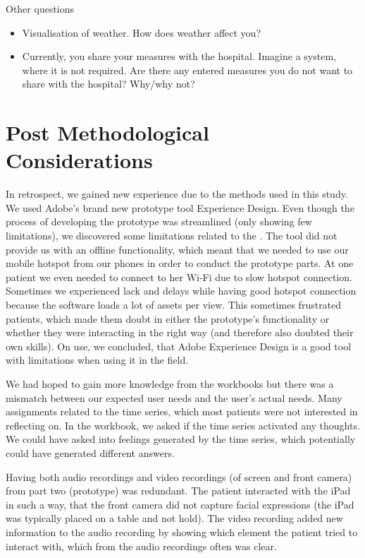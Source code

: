 Other questions
\begin{itemize}
\item Visualisation of weather. How does weather affect you?
\item Currently, you share your measures with the hospital. Imagine a system, where it is not required. Are there any entered measures you do not want to share with the hospital? Why/why not?
\end{itemize}



\section{Post Methodological Considerations}
In retrospect, we gained new experience due to the methods used in this study. We used Adobe's brand new prototype tool Experience Design. Even though the process of developing the prototype was streamlined (only showing few limitations), we discovered some limitations related to the . The tool did not provide us with an offline functionality, which meant that we needed to use our mobile hotspot from our phones in order to conduct the prototype parts. At one patient we even needed to connect to her Wi-Fi due to slow hotspot connection. Sometimes we  experienced lack and delays while having good hotspot connection because the software loads a lot of assets per view. This sometimes frustrated patients, which made them doubt in either the prototype's functionality or whether they were interacting in the right way (and therefore also doubted their own skills). On use, we concluded, that Adobe Experience Design is a good tool with limitations when using it in the field. 

We had hoped to gain more knowledge from the workbooks but there was a mismatch between our expected user needs and the user's actual needs. Many assignments related to the time series, which most patients were not interested in reflecting on. In the workbook, we asked if the time series activated any thoughts. We could have asked into feelings generated by the time series, which potentially could have generated different answers.

Having both audio recordings and video recordings (of screen and front camera) from part two (prototype) was redundant. The patient interacted with the iPad in such a way, that the front camera did not capture facial expressions (the iPad was typically placed on a table and not hold). The video recording added new information to the audio recording by showing which element the patient tried to interact with, which from the audio recordings often was clear.